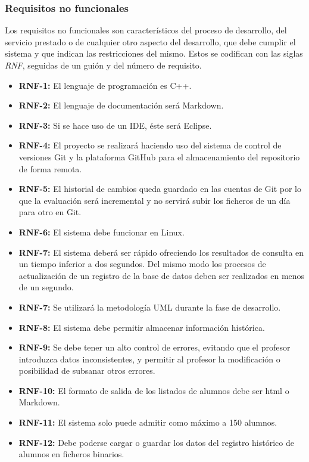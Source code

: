\subsubsection{Requisitos no funcionales}
Los requisitos no funcionales son característicos del proceso de desarrollo, del servicio prestado o de cualquier otro aspecto del desarrollo, que debe cumplir el sistema y que indican las restricciones del mismo. Estos se codifican con las siglas \textit{RNF}, seguidas de un guión y del número de requisito.

\begin{itemize}
	\item \textbf{RNF-1:} El lenguaje de programación es C++.
	\item \textbf{RNF-2:} El lenguaje de documentación será Markdown.
	\item \textbf{RNF-3:} Si se hace uso de un IDE, éste será Eclipse.
	\item \textbf{RNF-4:} El proyecto se realizará haciendo uso del sistema de control de versiones Git y la plataforma GitHub para el almacenamiento del repositorio de forma remota.
	\item \textbf{RNF-5:} El historial de cambios queda guardado en las cuentas de Git por lo que la evaluación será incremental y no servirá subir los ficheros de un día para otro en Git.
	\item \textbf{RNF-6:} El sistema debe funcionar en Linux.
	\item \textbf{RNF-7:} El sistema deberá ser rápido ofreciendo los resultados de consulta en un tiempo inferior a dos segundos. Del mismo modo los procesos de actualización de un registro de la base de datos deben ser realizados en menos de un segundo.
	\item \textbf{RNF-7:} Se utilizará la metodología UML durante la fase de desarrollo.
	\item \textbf{RNF-8:} El sistema debe permitir almacenar información histórica.
	\item \textbf{RNF-9:} Se debe tener un alto control de errores, evitando que el profesor introduzca datos inconsistentes, y permitir al profesor la modificación o posibilidad de subsanar otros errores.
	\item \textbf{RNF-10:} El formato de salida de los listados de alumnos debe ser html o Markdown.
	\item \textbf{RNF-11:} El sistema solo puede admitir como máximo a 150 alumnos.
	\item \textbf{RNF-12:} Debe poderse cargar o guardar los datos del registro histórico de alumnos en ficheros binarios.

\end{itemize}
